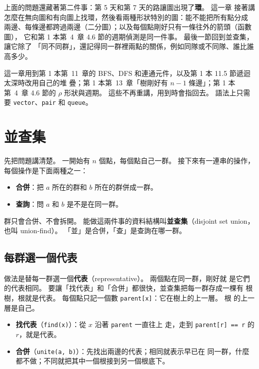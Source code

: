 上面的問題還藏著第二件事：第 5 天和第 7 天的路讓圖出現了\textbf{環}。 這一章
接著講怎麼在無向圖和有向圖上找環，然後看兩種形狀特別的圖：能不能把所有點分成
兩邊、每條邊都跨過兩邊（二分圖）；以及每個點剛好只有一條往外的箭頭（函數圖），
它和第 1 本第~4~章 4.6 節的週期偵測是同一件事。 最後一節回到並查集，讓它除了
「同不同群」，還記得同一群裡兩點的關係，例如同隊或不同隊、誰比誰高多少。

這一章用到第 1 本第~11~章的 BFS、DFS 和連通元件，以及第 1 本 11.5 節遞迴太深時改用自己的堆
疊；第 1 本第~13~章「樹剛好有 $n - 1$ 條邊」；第 1 本第~4~章 4.6 節的 $\rho$ 形狀與週期。
這些不再重講，用到時會指回去。 語法上只需要 \texttt{vector}、\texttt{pair}
和 \texttt{queue}。

\section{並查集}
\label{sec:dsu}

先把問題講清楚。 一開始有 $n$ 個點，每個點自己一群。 接下來有一連串的操作，
每個操作是下面兩種之一：

\begin{itemize}
\item \textbf{合併}：把 $a$ 所在的群和 $b$ 所在的群併成一群。
\item \textbf{查詢}：問 $a$ 和 $b$ 是不是在同一群。
\end{itemize}

群只會合併、不會拆開。 能做這兩件事的資料結構叫\textbf{並查集}（disjoint set
union，也叫 union-find）。 「並」是合併，「查」是查詢在哪一群。

\subsection{每群選一個代表}

做法是替每一群選一個\textbf{代表}（representative）。 兩個點在同一群，剛好就
是它們的代表相同。 要讓「找代表」和「合併」都很快，並查集把每一群存成一棵有
根樹，根就是代表。 每個點只記一個數 \texttt{parent[x]}：它在樹上的上一層。 根
的上一層是自己。

\begin{itemize}
\item \textbf{找代表}（\texttt{find(x)}）：從 $x$ 沿著 \texttt{parent} 一直往上
走，走到 \texttt{parent[r] == r} 的 $r$，就是代表。
\item \textbf{合併}（\texttt{unite(a, b)}）：先找出兩邊的代表；相同就表示早已在
同一群，什麼都不做；不同就把其中一個根接到另一個根底下。
\end{itemize}

